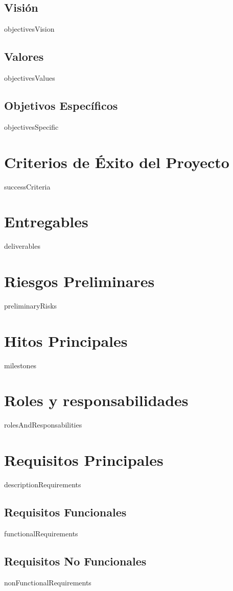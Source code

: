 \documentclass[12pt]{article}
\begin{document}
    \subsection{Visión}
    {{objectivesVision}}
    \subsection{Valores}
    {{objectivesValues}}
    \subsection{Objetivos Específicos}
    {{objectivesSpecific}}

    \section{Criterios de Éxito del Proyecto}
    {{successCriteria}}

    \section{Entregables}
    {{deliverables}}

    \section{Riesgos Preliminares}
    {{preliminaryRisks}}

    \section{Hitos Principales}
    {{milestones}}

    \section{Roles y responsabilidades}
    {{rolesAndResponsabilities}}

    \section{Requisitos Principales}
    {{descriptionRequirements}}
    \subsection{Requisitos Funcionales}
    {{functionalRequirements}}
    \subsection{Requisitos No Funcionales}
    {{nonFunctionalRequirements}}
\end{document}
